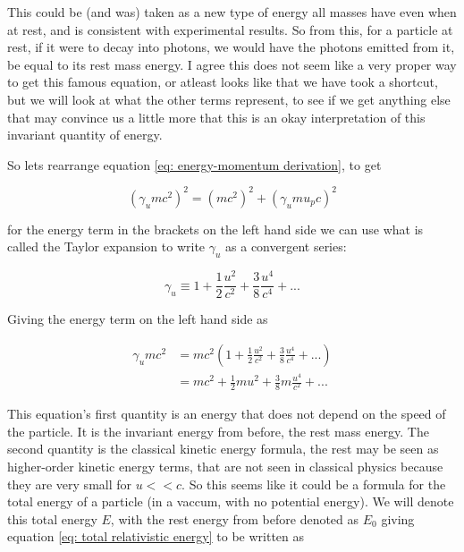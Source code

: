 This could be (and was) taken as a new type of energy all masses have even when at rest, and is consistent with experimental results.
So from this, for a particle at rest, if it were to decay into photons, we would have the photons emitted from it, be equal to its rest mass energy.
I agree this does not seem like a very proper way to get this famous equation, or atleast looks like that we have took a shortcut, but we will look at what the other terms represent, to see if we get anything else that may convince us a little more that this is an okay interpretation of this invariant quantity of energy.

So lets rearrange equation \eqref{eq: energy-momentum derivation}, to get

\begin{equation}
	\label{eq: total relativistic energy}
	\left( \gamma_{u} m {c}^2 \right)^2 = ({m}{c}^2)^2 + \left( \gamma_{u} {m}{u_p}{c}\right)^2
\end{equation}

for the energy term in the brackets on the left hand side we can use what is called the Taylor expansion to write $\gamma_{u}$ as a convergent series:

\begin{equation}
	\gamma_{u} \equiv 1 + \frac{1}{2}\frac{u^2}{{c}^2} + \frac{3}{8}\frac{u^4}{c^4} + ...
\end{equation}

Giving the energy term on the left hand side as

\begin{equation}
	\begin{aligned}
		\gamma_{u} {m}{c}^2 & = {m}{c}^2  \left(1 + \frac{1}{2}\frac{u^2}{{c}^2} + \frac{3}{8}\frac{u^4}{c^4} + ...
		\right)                                                                                                 \\
		                & = {m}{c}^2 + \frac{1}{2}{m}{u}^2 + \frac{3}{8}m\frac{u^4}{{c}^2} + ...
	\end{aligned}
\end{equation}

This equation's first quantity is an energy that does not depend on the speed of the particle.
It is the invariant energy from before, the rest mass energy.
The second quantity is the classical kinetic energy formula, the rest may be seen as higher-order kinetic energy terms, that are not seen in classical physics because they are very small for ${u}<<{c}$.
So this seems like it could be a formula for the total energy of a particle (in a vaccum, with no potential energy).
We will denote this total energy ${E}$, with the rest energy from before denoted as $E_0$ giving equation \eqref{eq: total relativistic energy} to be written as

